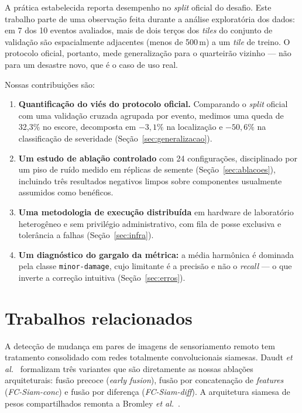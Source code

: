 \documentclass[11pt,a4paper]{article}
\begin{document}
A prática estabelecida reporta desempenho no \emph{split} oficial do desafio.
Este trabalho parte de uma observação feita durante a análise exploratória dos
dados: em 7 dos 10 eventos avaliados, mais de dois terços dos \emph{tiles} do
conjunto de validação são espacialmente adjacentes (menos de 500\,m) a um
\emph{tile} de treino. O protocolo oficial, portanto, mede generalização para o
quarteirão vizinho --- não para um desastre novo, que é o caso de uso real.

Nossas contribuições são:

\begin{enumerate}
  \item \textbf{Quantificação do viés do protocolo oficial.} Comparando o
  \emph{split} oficial com uma validação cruzada agrupada por evento, medimos
  uma queda de 32{,}3\% no escore, decomposta em $-3{,}1\%$ na localização e
  $-50{,}6\%$ na classificação de severidade (Seção~\ref{sec:generalizacao}).

  \item \textbf{Um estudo de ablação controlado} com 24 configurações,
  disciplinado por um piso de ruído medido em réplicas de semente
  (Seção~\ref{sec:ablacoes}), incluindo três resultados negativos limpos sobre
  componentes usualmente assumidos como benéficos.

  \item \textbf{Uma metodologia de execução distribuída} em hardware de
  laboratório heterogêneo e sem privilégio administrativo, com fila de posse
  exclusiva e tolerância a falhas (Seção~\ref{sec:infra}).

  \item \textbf{Um diagnóstico do gargalo da métrica:} a média harmônica é
  dominada pela classe \texttt{minor-damage}, cujo limitante é a precisão e não
  o \emph{recall} --- o que inverte a correção intuitiva
  (Seção~\ref{sec:erros}).
\end{enumerate}

\section{Trabalhos relacionados}

A detecção de mudança em pares de imagens de sensoriamento remoto tem tratamento
consolidado com redes totalmente convolucionais siamesas. Daudt \emph{et
al.}~\cite{daudt2018} formalizam três variantes que são diretamente as nossas
ablações arquiteturais: fusão precoce (\emph{early fusion}), fusão por
concatenação de \emph{features} (\emph{FC-Siam-conc}) e fusão por diferença
(\emph{FC-Siam-diff}). A arquitetura siamesa de pesos compartilhados remonta a
Bromley \emph{et al.}~\cite{bromley1993}.
\end{document}
